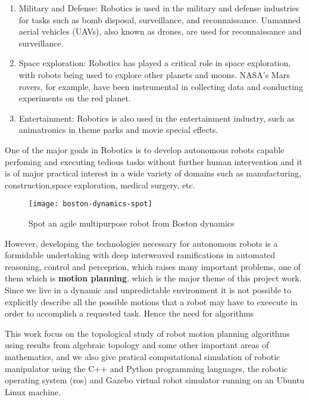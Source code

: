 \begin{enumerate}
    \item Military and Defense: Robotics is used in the military and defense industries for tasks such as bomb disposal, surveillance, and reconnaissance. Unmanned aerial vehicles (UAVs), also known as drones, are used for reconnaissance and surveillance.

    \item Space exploration: Robotics has played a critical role in space exploration, with robots being used to explore other planets and moons. NASA's Mars rovers, for example, have been instrumental in collecting data and conducting experiments on the red planet.
    
    

    \item Entertainment: Robotics is also used in the entertainment industry, such as animatronics in theme parks and movie special effects.
\end{enumerate}

One of the major goals in Robotics is to develop autonomous robots capable perfoming and executing tedious tasks without further human intervention and it is of major practical interest in a wide variety of domains such as manufacturing, construction,space exploration, medical surgery, etc.
\begin{figure}[H]
    \centering
    \texttt{[image: boston-dynamics-spot]}
    \caption[Boston dynamics robot (spot)]{Spot an agile multipurpose robot from Boston dynamics \protect\footnotemark} 
\end{figure}
However, developing the technologies necessary for autonomous robots is a formidable undertaking with deep interweaved ramifications in automated reasoning, control and perceprion, which raises many important problems, one of them which is \textbf{motion planning}, which is the major theme of this project work. Since we live in a dynamic and unpredictable environment it is not possible to explicitly describe all the possible motions that a robot may have to exeecute in order to accomplish a requested task. Hence the need for algorithms 

This work focus on the topological study of robot motion planning algorithms using results from algebraic topology and some other important areas of mathematics, and we also give pratical computational simulation of robotic manipulator using the C++ and Python programming languages, the robotic operating system (ros) and Gazebo virtual robot simulator running on an Ubuntu Linux machine.

